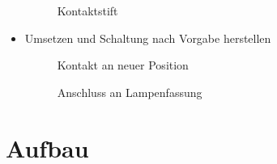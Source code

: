 \documentclass[ngerman,11pt,parskip=half] {scrartcl}
\begin{document}
\begin{itemize}
\begin{figure}[H]
\begin{tikzpicture}
\end{tikzpicture}
\caption{Kontaktstift} \label{fig:kontakt-feder}
\end{figure}
\item Umsetzen und Schaltung nach Vorgabe herstellen
\begin{figure}[H]
\centering
{}
\caption{Kontakt an neuer Position} \label{fig:1}
\end{figure}
\begin{figure}[H]
\centering
{}
\caption{Anschluss an Lampenfassung} \label{fig:1}
\end{figure}
\end{itemize}


\section{Aufbau} \label{sec:aufbau}
\end{document}
